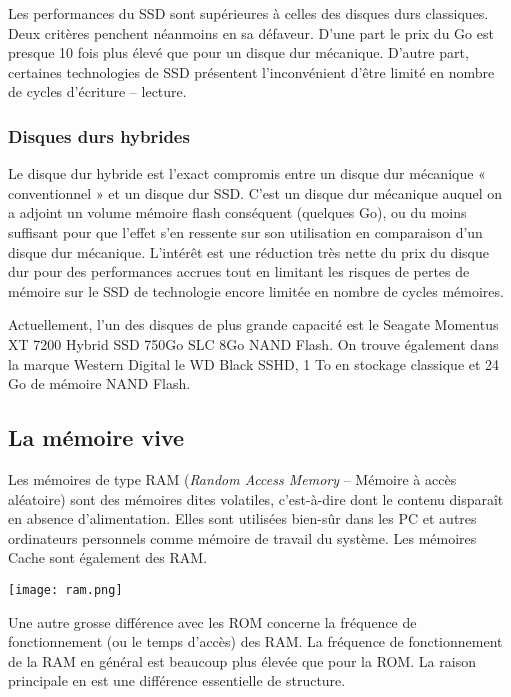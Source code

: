 Les performances du SSD sont supérieures à celles des disques durs classiques. Deux critères penchent néanmoins en sa défaveur. D'une part le prix du Go est presque 10 fois plus élevé 
que pour un disque dur mécanique. D'autre part, certaines technologies de SSD présentent l'inconvénient d'être limité en nombre de cycles d'écriture -- lecture.

\subsubsection{Disques durs hybrides}
Le disque dur hybride est l'exact compromis entre un disque dur mécanique « conventionnel » et un disque dur SSD. C'est un disque dur mécanique auquel on a adjoint un volume mémoire flash conséquent (quelques Go), ou du moins suffisant pour que l'effet s'en ressente sur son utilisation en comparaison d'un disque dur mécanique. L'intérêt est une réduction très nette du prix du disque dur pour des performances accrues tout en limitant les risques de pertes de mémoire sur le SSD de technologie encore limitée en nombre de cycles mémoires.


Actuellement, l'un des disques de plus grande capacité est le Seagate Momentus XT 7200 Hybrid SSD 750Go SLC 8Go NAND Flash. On trouve également dans la marque Western Digital le WD Black SSHD, 1 To en stockage classique et 24 Go de mémoire NAND Flash.



\subsection{La mémoire vive}

\noindent \begin{minipage}[c]{.6\linewidth}
Les mémoires de type RAM (\textit{Random Access Memory} -- Mémoire à accès aléatoire) sont des mémoires dites volatiles, c'est-à-dire dont le contenu disparaît en absence d'alimentation.
Elles sont utilisées bien-sûr dans les PC et autres ordinateurs personnels comme mémoire de travail du système. Les mémoires Cache sont également des RAM.


\end{minipage}
\begin{minipage}[c]{.3\linewidth}
\begin{center}
\texttt{[image: ram.png]}
\end{center}
\end{minipage}

Une autre grosse différence avec les ROM concerne la fréquence de fonctionnement (ou le temps d'accès) des RAM. La fréquence de fonctionnement de la RAM en général est beaucoup plus élevée que pour la ROM. La raison principale en est une différence essentielle de structure.

